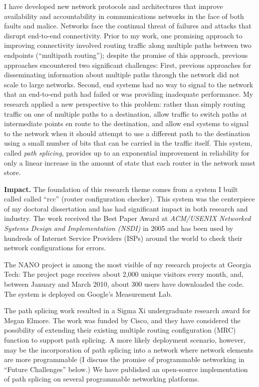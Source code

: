 I have developed new network protocols and architectures that improve
availability and accountability in communications networks in the face
of both faults and malice.  Networks face the continual threat of
failures and attacks that disrupt end-to-end connectivity.  Prior to my
work, one promising approach to improving connectivity involved routing
traffic along multiple paths between two endpoints (``multipath
routing''); despite the promise of this approach, previous approaches
encountered two significant challenges: First, previous approaches for
disseminating information about multiple paths through the network did
not scale to large networks.  Second, end systems had no way to signal
to the network that an end-to-end path had failed or was providing
inadequate performance.  My research applied a new perspective to this
problem: rather than simply routing traffic on one of multiple paths to
a destination, allow traffic to switch paths at intermediate points en
route to the destination, and allow end systems to signal to the network
when it should attempt to use a different path to the destination using
a small number of bits that can be carried in the traffic itself.  This
system, called {\em path splicing}, provides up to an exponential
improvement in reliability for only a linear increase in the amount of
state that each router in the network must store.


{\bf Impact.} The foundation of this research theme comes from a system
I built called called ``rcc'' (router configuration checker).  This
system was the centerpiece of my doctoral dissertation and has had
significant impact in both research and industry.  The work received the
Best Paper Award at {\em ACM/USENIX Networked Systems Design and
Implementation (NSDI)} in 2005 and has been used by hundreds of Internet
Service Providers (ISPs) around the world to check their network
configurations for errors.

The NANO project is among the most visible of my research projects at
Georgia Tech: The project page receives about 2,000 unique visitors
every month, and, between January and March 2010, about 300 users have
downloaded the code.  The system is deployed on Google's Measurement
Lab.

The path splicing work resulted in a Sigma Xi undergraduate research
award for Megan Elmore.  The work was funded by Cisco, and they have
considered the possibility of extending their existing multiple routing
configuration (MRC) function to support path splicing.  A more likely
deployment scenario, however, may be the incorporation of path splicing
into a network where network elements are more programmable (I discuss
the promise of programmable networking in ``Future Challenges'' below.)
We have published an open-source implementation of path splicing on
several programmable networking platforms.

